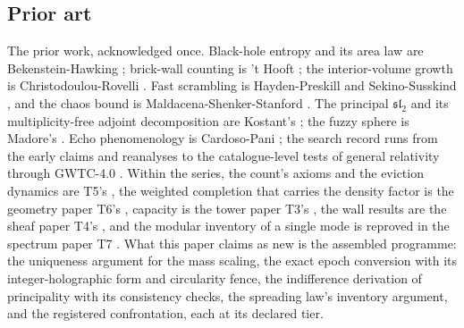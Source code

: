 \documentclass[11pt]{article}
\theoremstyle{definition}
\theoremstyle{plain}
\begin{document}
\subsection*{Prior art}
\label{c:note.scrambling.setting-prior-art}
The prior work, acknowledged once. Black-hole entropy and its area law are Bekenstein-Hawking \cite{Bekenstein1973, Hawking1975}; brick-wall counting is 't Hooft \cite{tHooft1985}; the interior-volume growth is Christodoulou-Rovelli \cite{ChristodoulouRovelli2015}. Fast scrambling is Hayden-Preskill and Sekino-Susskind \cite{HaydenPreskill2007, SekinoSusskind2008}, and the chaos bound is Maldacena-Shenker-Stanford \cite{MSS2016}. The principal $\mathfrak{sl}_2$ and its multiplicity-free adjoint decomposition are Kostant's \cite{Kostant1959}; the fuzzy sphere is Madore's \cite{Madore1992}. Echo phenomenology is Cardoso-Pani \cite{CardosoPani2017}; the search record runs from the early claims and reanalyses \cite{Abedi2017, Westerweck2018} to the catalogue-level tests of general relativity through GWTC-4.0 \cite{GWTC4TGR2026}. Within the series, the count's axioms and the eviction dynamics are T5's \cite{ButlerT5}, the weighted completion that carries the density factor is the geometry paper T6's \cite{ButlerT6}, capacity is the tower paper T3's \cite{ButlerT3}, the wall results are the sheaf paper T4's \cite{ButlerT4}, and the modular inventory of a single mode is reproved in the spectrum paper T7 \cite{ButlerT7}. What this paper claims as new is the assembled programme: the uniqueness argument for the mass scaling, the exact epoch conversion with its integer-holographic form and circularity fence, the indifference derivation of principality with its consistency checks, the spreading law's inventory argument, and the registered confrontation, each at its declared tier.
\end{document}
